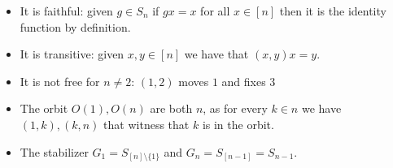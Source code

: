 \begin{cExercise}
	\begin{cPart}
		\begin{itemize}
			\item It is faithful: given $g\in S_n$ if $gx=x$ for all $x\in [n]$ then it is the identity function by definition.
			
			\item It is transitive: given $x,y\in [n]$ we have that $(x,y)x=y$.
			
			\item It is not free for $n\ne 2$: $(1,2)$ moves $1$ and fixes $3$
			
			\item The orbit $O(1),O(n)$ are both $n$, as for every $k\in n$ we have $(1,k),(k,n)$ that witness that $k$ is in the orbit.
			
			\item The stabilizer $G_1=S_{[n]\setminus \{1\}}$ and $G_n=S_{[n-1]}=S_{n-1}$.
			

\end{itemize}
\end{cPart}
\end{cExercise}
